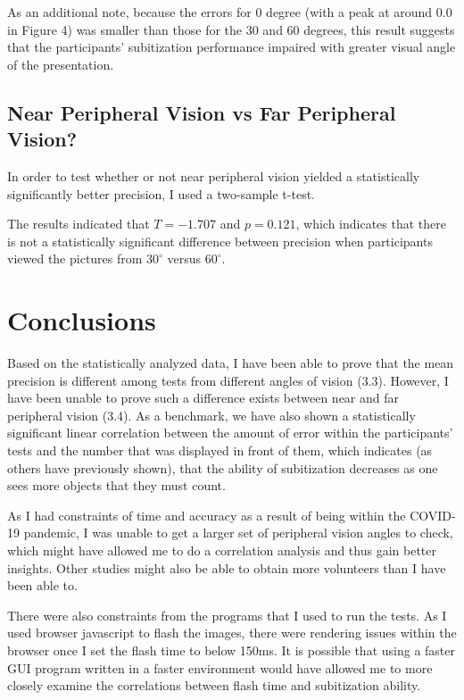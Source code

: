 \documentclass[12pt]{article}
\begin{document}
As an additional note, because the errors for 0 degree (with a peak at around
$0.0$ in Figure 4) was smaller than those for the 30 and 60 degrees,
this result suggests that the participants’ subitization performance
impaired with greater visual angle of the presentation.

\subsection{Near Peripheral Vision vs Far Peripheral Vision?}

In order to test whether or not near peripheral vision yielded a statistically
significantly better precision, I used a two-sample t-test.

The results indicated that $T = -1.707$ and $p = 0.121$, which indicates that
there is not a statistically significant difference between precision when
participants viewed the pictures from $30^{\circ}$ versus $60^{\circ}$.

\section{Conclusions}
Based on the statistically analyzed data, I have been able to prove that the
mean precision is different among tests from different angles of vision (3.3).
However, I have been unable to prove such a difference exists between near and
far peripheral vision (3.4). As a benchmark, we have also shown a statistically
significant linear correlation between the amount of error within the
participants' tests and the number that was displayed in front of them, which
indicates (as others have previously shown), that the ability of subitization
decreases as one sees more objects that they must count.

As I had constraints of time and accuracy as a result of being within the
COVID-19 pandemic, I was unable to get a larger set of peripheral vision angles
to check, which might have allowed me to do a correlation analysis and thus
gain better insights. Other studies might also be able to obtain more
volunteers than I have been able to.

There were also constraints from the programs that I used to run the tests. As
I used browser javascript to flash the images, there were rendering issues
within the browser once I set the flash time to below 150ms. It is possible
that using a faster GUI program written in a faster environment would have
allowed me to more closely examine the correlations between flash time and
subitization ability.
\end{document}
